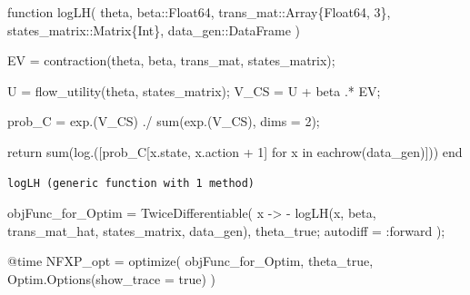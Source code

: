 \documentclass[
  letterpaper,
  DIV=11,
  numbers=noendperiod]{scrreprt}
\newenvironment{Shaded}{\begin{snugshade}}{\end{snugshade}}
\newcommand{\ConstantTok}[1]{\textcolor[rgb]{0.56,0.35,0.01}{#1}}
\newcommand{\ControlFlowTok}[1]{\textcolor[rgb]{0.00,0.23,0.31}{#1}}
\newcommand{\DataTypeTok}[1]{\textcolor[rgb]{0.68,0.00,0.00}{#1}}
\newcommand{\FloatTok}[1]{\textcolor[rgb]{0.68,0.00,0.00}{#1}}
\newcommand{\FunctionTok}[1]{\textcolor[rgb]{0.28,0.35,0.67}{#1}}
\newcommand{\KeywordTok}[1]{\textcolor[rgb]{0.00,0.23,0.31}{#1}}
\newcommand{\NormalTok}[1]{\textcolor[rgb]{0.00,0.23,0.31}{#1}}
\newcommand{\OperatorTok}[1]{\textcolor[rgb]{0.37,0.37,0.37}{#1}}
\newcommand{\PreprocessorTok}[1]{\textcolor[rgb]{0.68,0.00,0.00}{#1}}
\begin{document}
\begin{Shaded}
\begin{Highlighting}[]
\KeywordTok{function} \FunctionTok{logLH}\NormalTok{(}
\NormalTok{    theta,}
\NormalTok{    beta}\OperatorTok{::}\DataTypeTok{Float64}\NormalTok{,}
\NormalTok{    trans\_mat}\OperatorTok{::}\DataTypeTok{Array\{Float64, 3\}}\NormalTok{,}
\NormalTok{    states\_matrix}\OperatorTok{::}\DataTypeTok{Matrix\{Int\}}\NormalTok{,}
\NormalTok{    data\_gen}\OperatorTok{::}\DataTypeTok{DataFrame}
\NormalTok{)}

\NormalTok{    EV }\OperatorTok{=} \FunctionTok{contraction}\NormalTok{(theta, beta, trans\_mat, states\_matrix);}
    
\NormalTok{    U }\OperatorTok{=} \FunctionTok{flow\_utility}\NormalTok{(theta, states\_matrix);}
\NormalTok{    V\_CS }\OperatorTok{=}\NormalTok{ U }\OperatorTok{+}\NormalTok{ beta }\OperatorTok{.*}\NormalTok{ EV;}

\NormalTok{    prob\_C }\OperatorTok{=} \FunctionTok{exp}\NormalTok{.(V\_CS) }\OperatorTok{./} \FunctionTok{sum}\NormalTok{(}\FunctionTok{exp}\NormalTok{.(V\_CS), dims }\OperatorTok{=} \FloatTok{2}\NormalTok{);}

    \ControlFlowTok{return} \FunctionTok{sum}\NormalTok{(}\FunctionTok{log}\NormalTok{.([prob\_C[x.state, x.action }\OperatorTok{+} \FloatTok{1}\NormalTok{] for x }\KeywordTok{in} \FunctionTok{eachrow}\NormalTok{(data\_gen)]))}
\KeywordTok{end}
\end{Highlighting}
\end{Shaded}

\begin{verbatim}
logLH (generic function with 1 method)
\end{verbatim}

\begin{Shaded}
\begin{Highlighting}[]
\NormalTok{objFunc\_for\_Optim }\OperatorTok{=} \FunctionTok{TwiceDifferentiable}\NormalTok{(}
\NormalTok{    x }\OperatorTok{{-}\textgreater{}} \OperatorTok{{-}} \FunctionTok{logLH}\NormalTok{(x, beta, trans\_mat\_hat, states\_matrix, data\_gen),}
\NormalTok{    theta\_true;}
\NormalTok{    autodiff }\OperatorTok{=} \OperatorTok{:}\NormalTok{forward}
\NormalTok{    );}

\PreprocessorTok{@time}\NormalTok{ NFXP\_opt }\OperatorTok{=} \FunctionTok{optimize}\NormalTok{(}
\NormalTok{    objFunc\_for\_Optim,}
\NormalTok{    theta\_true,}
\NormalTok{    Optim.}\FunctionTok{Options}\NormalTok{(show\_trace }\OperatorTok{=} \ConstantTok{true}\NormalTok{)}
\NormalTok{)}
\end{Highlighting}
\end{Shaded}
\end{document}
